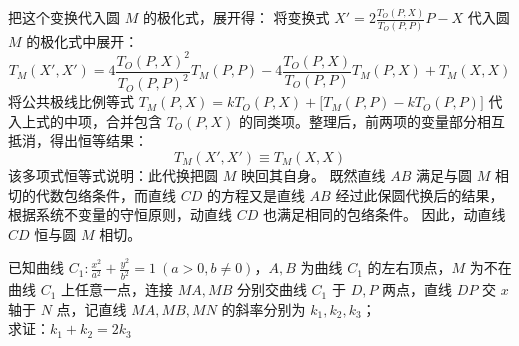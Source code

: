 \begin{solution}
把这个变换代入圆 $M$ 的极化式，展开得：
将变换式 $X' = 2 \frac{T_O(P,X)}{T_O(P,P)} P - X$ 代入圆 $M$ 的极化式中展开：
$$ T_M(X', X') = 4 \frac{T_O(P,X)^2}{T_O(P,P)^2} T_M(P,P) - 4 \frac{T_O(P,X)}{T_O(P,P)} T_M(P,X) + T_M(X,X) $$
将公共极线比例等式 $T_M(P,X) = k T_O(P,X) + \big[T_M(P,P) - k T_O(P,P)\big]$ 代入上式的中项，合并包含 $T_O(P,X)$ 的同类项。整理后，前两项的变量部分相互抵消，得出恒等结果：
$$ T_M(X', X') \equiv T_M(X,X) $$
该多项式恒等式说明：此代换把圆 $M$ 映回其自身。
既然直线 $AB$ 满足与圆 $M$ 相切的代数包络条件，而直线 $CD$ 的方程又是直线 $AB$ 经过此保圆代换后的结果，根据系统不变量的守恒原则，动直线 $CD$ 也满足相同的包络条件。
因此，动直线 $CD$ 恒与圆 $M$ 相切。
\end{solution}

\begin{exercise}
已知曲线 \(C_1: \frac{x^2}{a^2} + \frac{y^2}{b^2} = 1\ (a > 0, b \neq 0)\)，\(A, B\) 为曲线 \(C_1\) 的左右顶点，\(M\) 为不在曲线 \(C_1\) 上任意一点，连接 \(MA, MB\) 分别交曲线 \(C_1\) 于 \(D, P\) 两点，直线 \(DP\) 交 \(x\) 轴于 \(N\) 点，记直线 \(MA, MB, MN\) 的斜率分别为 \(k_1, k_2, k_3\)；\\
求证：\(k_1 + k_2 = 2k_3\)
\end{exercise}
